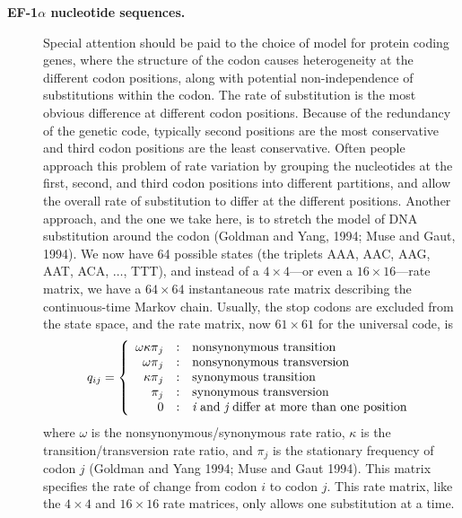 \documentclass{svmult}
\begin{document}
\begin{description}
\item[ {\bf EF-1$\alpha$ nucleotide sequences.}] Special attention should be paid to the choice of model for protein coding genes, where the structure of the codon 
causes heterogeneity at the different codon positions, along with potential non-independence of substitutions within the codon. The rate of substitution is the most 
obvious difference at different codon positions. Because of the redundancy of the genetic code, typically second positions are the most conservative and third codon positions
are the least conservative. Often people approach this problem of rate variation by grouping the nucleotides at the first, second, and third codon positions into different partitions, and allow
the overall rate of substitution to differ at the different positions. Another approach, and the one we take here, is to stretch the model of DNA substitution around the
codon (Goldman and Yang, 1994; Muse and Gaut, 1994). We now have 64 possible states (the triplets AAA, AAC, AAG, AAT, ACA, $\ldots$, TTT), and instead of a $4 \times 4$---or even a $16 \times 16$---rate matrix,
we have a $64 \times 64$ instantaneous rate matrix describing the continuous-time Markov chain.
Usually, the stop codons are excluded from the state space, and the rate matrix, now $61 \times 61$ for the universal code, is
$$
q_{ij} = \left\{
   \begin{array}{r@{\quad:\quad}l}
      {\omega \kappa \pi}_j & \mbox{nonsynonymous transition}                             \\
      {\omega        \pi}_j & \mbox{nonsynonymous transversion}                           \\    
      {       \kappa \pi}_j & \mbox{synonymous transition}                                \\    
      {              \pi}_j & \mbox{synonymous transversion}                              \\
      0                    & \mbox{{\it i} and {\it j} differ at more than one position} 
   \end{array}
\right.
$$
where $\omega$ is the nonsynonymous/synonymous rate ratio, $\kappa$ is the transition/transversion
rate ratio, and ${\pi}_j$ is the stationary frequency of codon $j$ (Goldman and Yang 1994; Muse and Gaut 1994). 
This matrix specifies the rate of change from codon $i$ to codon $j$. This rate matrix, like the $4 \times 4$ and $16 \times 16$ rate matrices, 
only allows one substitution at a time.\\


\end{description}
\end{document}
